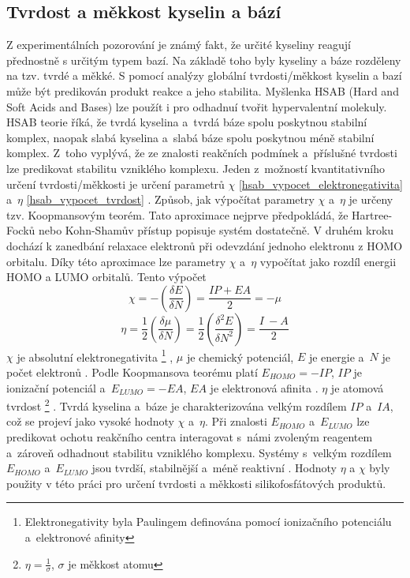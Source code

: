 \documentclass[
  digital, %
  table,   %
  lof,     %
  lot,     %
  oneside,
]{fithesis3}
\begin{document}
\subsection{Tvrdost a měkkost kyselin a bází}
Z experimentálních pozorování je známý fakt, že určité kyseliny reagují přednostně s určitým typem bazí. Na základě toho byly kyseliny a báze rozděleny na tzv. tvrdé a měkké.
 S pomocí analýzy globální tvrdosti/měkkost kyselin a bazí může být predikován produkt reakce a jeho stabilita. Myšlenka HSAB (Hard and Soft Acids and Bases) lze použít i pro odhadnuí tvořit hypervalentní molekuly. HSAB teorie říká, že tvrdá kyselina a~tvrdá báze spolu poskytnou stabilní komplex, naopak slabá kyselina a~slabá báze spolu poskytnou méně stabilní komplex. Z~toho vyplývá, že ze znalosti reakčních podmínek a~příslušné tvrdosti lze predikovat stabilitu vzniklého komplexu. Jeden z~možností kvantitativního určení tvrdosti/měkkosti je určení parametrů $\chi$ \ref{hsab_vypocet_elektronegativita} a~$\eta$ \ref{hsab_vypocet_tvrdost} \cite{hsabclanek}. Způsob, jak výpočítat parametry $\chi$ a~$\eta$ je určeny tzv. Koopmansovým teorém. Tato aproximace nejprve předpokládá, že Hartree-Focků nebo Kohn-Shamův přístup popisuje systém dostatečně. V druhém kroku dochází k zanedbání relaxace elektronů při odevzdání jednoho elektronu z HOMO orbitalu. Díky této aproximace lze parametry $\chi$ a~$\eta$ vypočítat jako rozdíl energii HOMO a LUMO orbitalů. Tento výpočet
 \begin{equation}
 \chi = - \left( \frac{\delta E}{\delta N} \right) = \frac{IP + EA}{2} = -\mu
 \label{hsab_vypocet_elektronegativita}
 \end{equation}
 \begin{equation}
 \eta = \frac{1}{2} \left( \frac{\delta \mu}{\delta N} \right) = \frac{1}{2}\left( \frac{\delta^2 E}{\delta N^2} \right) = \frac{I~- A}{2}
 \label{hsab_vypocet_tvrdost}
 \end{equation}
 $\chi$ je absolutní elektronegativita  \footnote{Elektronegativity byla Paulingem definována pomocí ionizačního potenciálu a~elektronové afinity} , $\mu$ je chemický potenciál, $E$ je energie a~$N$ je počet elektronů \cite{hsabwatoc}. Podle Koopmansova teorému platí $E_{HOMO} = - IP$, $IP$ je ionizační potenciál a~$E_{LUMO} = -EA$, $EA$ je elektronová afinita \cite{kratochvilexcerpta}. $\eta$ je atomová tvrdost \footnote{$\eta = \frac{1}{\sigma}$, $\sigma$ je měkkost atomu} \cite{pearson1986absolute}. Tvrdá kyselina a~báze je charakterizována velkým rozdílem $IP$ a~$IA$, což se projeví jako vysoké hodnoty $\chi$ a~$\eta$. Při znalosti $E_{HOMO}$ a~$E_{LUMO}$ lze predikovat ochotu reakčního centra interagovat s~námi zvoleným reagentem a~zároveň odhadnout stabilitu vzniklého komplexu. Systémy s~velkým rozdílem $E_{HOMO}$ a~$E_{LUMO}$ jsou tvrdší, stabilnější a~méně reaktivní \cite{hsabwatoc}. Hodnoty $\eta$ a $\chi$ byly použity v této práci pro určení tvrdosti a měkkosti silikofosfátových produktů.
\end{document}

